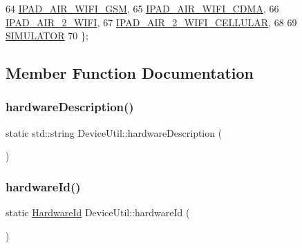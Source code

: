 \begin{DoxyCode}
64     \mbox{\hyperlink{class_device_util_a45e0ab9d49e3a0583798709c4613d9b6a5806cb025d9d3d380ddb5bf58e0d3f58}{IPAD\_AIR\_WIFI\_GSM}},
65     \mbox{\hyperlink{class_device_util_a45e0ab9d49e3a0583798709c4613d9b6a8c35811bc1218577794b0320ff7740df}{IPAD\_AIR\_WIFI\_CDMA}},
66     \mbox{\hyperlink{class_device_util_a45e0ab9d49e3a0583798709c4613d9b6a448de67eccb6fb2cb667da6836f59edb}{IPAD\_AIR\_2\_WIFI}},
67     \mbox{\hyperlink{class_device_util_a45e0ab9d49e3a0583798709c4613d9b6aaf6e21e19c261926b25ed94a09cd5742}{IPAD\_AIR\_2\_WIFI\_CELLULAR}},
68 
69     \mbox{\hyperlink{class_device_util_a45e0ab9d49e3a0583798709c4613d9b6a5cb482919e3998b2e07aefe149afd8f9}{SIMULATOR}}
70   \};
\end{DoxyCode}


\subsection{Member Function Documentation}
\mbox{\label{class_device_util_a0b41896ef1ac3277c1126341bee50d26}} 
\subsubsection{\texorpdfstring{hardware\+Description()}{hardwareDescription()}}
{\footnotesize\ttfamily static std\+::string Device\+Util\+::hardware\+Description (\begin{DoxyParamCaption}{ }\end{DoxyParamCaption})\hspace{0.3cm}{\ttfamily [static]}}

\mbox{\label{class_device_util_aeacce8246f59676945b5f1914a08fb4a}} 
\subsubsection{\texorpdfstring{hardware\+Id()}{hardwareId()}}
{\footnotesize\ttfamily static \mbox{\hyperlink{class_device_util_a45e0ab9d49e3a0583798709c4613d9b6}{Hardware\+Id}} Device\+Util\+::hardware\+Id (\begin{DoxyParamCaption}{ }\end{DoxyParamCaption})\hspace{0.3cm}{\ttfamily [static]}}

